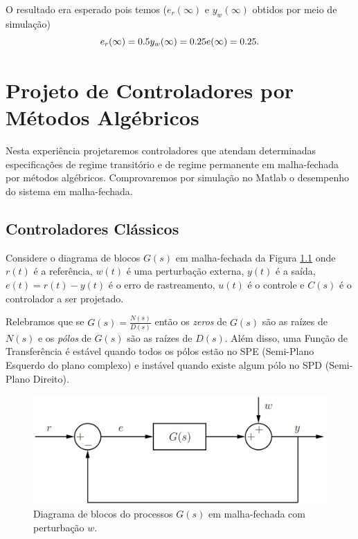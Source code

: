 \documentclass[
]{book}
\theoremstyle{definition}
\theoremstyle{definition}
\theoremstyle{definition}
\theoremstyle{remark}
\begin{document}
O resultado era esperado pois temos (\(e_r(\infty)\) e \(y_w(\infty)\) obtidos por meio de simulação)
\[
e_r(\infty) = 0.5 \\
y_w(\infty) = 0.25 \\
e(\infty) = 0.25.
\]

\hypertarget{lab5}{%
\chapter{Projeto de Controladores por Métodos Algébricos}\label{lab5}}

Nesta experiência projetaremos controladores que atendam determinadas especificações de regime transitório e de regime permanente em malha-fechada por métodos algébricos. Comprovaremos por simulação no Matlab o desempenho do sistema em malha-fechada.

\hypertarget{controladores-cluxe1ssicos}{%
\section{Controladores Clássicos}\label{controladores-cluxe1ssicos}}

Considere o diagrama de blocos \(G(s)\) em malha-fechada da Figura \ref{fig:fig51} onde \(r(t)\) é a referência, \(w(t)\) é uma perturbação externa, \(y(t)\) é a saída, \(e(t) = r(t) - y(t)\) é o erro de rastreamento, \(u(t)\) é o controle e \(C(s)\) é o controlador a ser projetado.

Relebramos que se \(G(s) = \frac {N(s)}{D(s)}\) então os \emph{zeros} de \(G(s)\) são as raízes de \(N(s)\) e os \emph{pólos} de \(G(s)\) são as raízes de \(D(s)\). Além disso, uma Função de Transferência é estável quando todos os pólos estão no SPE (Semi-Plano Esquerdo do plano complexo) e instável quando existe algum pólo no SPD (Semi-Plano Direito).

\begin{figure}

{\centering \includegraphics[width=0.8\linewidth]{Imagens/Lab4/Apresentação/fig1} 

}

\caption{Diagrama de blocos do processos $G(s)$ em malha-fechada com perturbação $w$.}\label{fig:fig51}
\end{figure}
\end{document}
